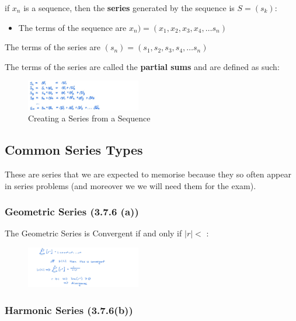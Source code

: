 \documentclass[class=article, crop=false]{standalone}
\begin{document}
if \(x_n\) is a sequence, then the \textbf{series} generated by the
sequence is \(S = (s_k)\):

\begin{itemize}
\item
  The terms of the sequence are
  \(x_n) = (x_1, x_2, x_3, x_4, \dots s_n)\)
\end{itemize}

The terms of the series are \((s_n) = (s_1, s_2, s_3, s_4, \dots s_n)\)

The terms of the series are called the \textbf{partial sums} and are
defined as such:

\begin{figure}%
\centering
\caption[Handwritten Series from Sequence]{Creating a Series from a Sequence}
\includegraphics[width=5cm]{media/InfSeries/kdskfdsakj.jpeg}
\end{figure}

\hypertarget{header-n3150}{%
\subsection{Common Series Types}\label{header-n3150}}

These are series that we are expected to memorise because they so often
appear in series problems (and moreover we we will need them for the
exam).

\hypertarget{header-n3152}{%
\subsubsection{Geometric Series (3.7.6 (a))}\label{header-n3152}}

The Geometric Series is Convergent if and only if \(\mid r \mid < \) :

\begin{figure}
\centering
\includegraphics[width=5cm]{media/InfSeries/2B17FDDA-A24C-436F-B18E-73B69AF54A69.jpeg}
\caption{}
\end{figure}

\newpage
\hypertarget{header-n3155}{%
\subsubsection{Harmonic Series (3.7.6(b))}\label{header-n3155}}
\end{document}
